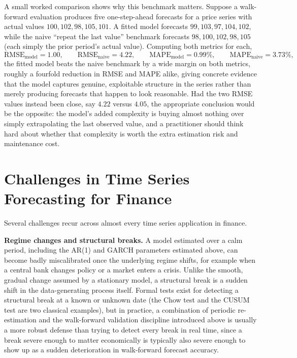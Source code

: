 \documentclass[../ai_in_finance]{subfiles}
\begin{document}
A small worked comparison shows why this benchmark matters. Suppose a walk-forward evaluation produces five one-step-ahead forecasts for a price series with actual values $100, 102, 98, 105, 101$. A fitted model forecasts $99, 103, 97, 104, 102$, while the naive ``repeat the last value'' benchmark forecasts $98, 100, 102, 98, 105$ (each simply the prior period's actual value). Computing both metrics for each,
\begin{equation*}
\text{RMSE}_{\text{model}} = 1.00, \qquad \text{RMSE}_{\text{naive}} = 4.22, \qquad \text{MAPE}_{\text{model}} = 0.99\%, \qquad \text{MAPE}_{\text{naive}} = 3.73\%,
\end{equation*}
the fitted model beats the naive benchmark by a wide margin on both metrics, roughly a fourfold reduction in RMSE and MAPE alike, giving concrete evidence that the model captures genuine, exploitable structure in the series rather than merely producing forecasts that happen to look reasonable. Had the two RMSE values instead been close, say $4.22$ versus $4.05$, the appropriate conclusion would be the opposite: the model's added complexity is buying almost nothing over simply extrapolating the last observed value, and a practitioner should think hard about whether that complexity is worth the extra estimation risk and maintenance cost.

\section{Challenges in Time Series Forecasting for Finance}

Several challenges recur across almost every time series application in finance.

\textbf{Regime changes and structural breaks.} A model estimated over a calm period, including the AR(1) and GARCH parameters estimated above, can become badly miscalibrated once the underlying regime shifts, for example when a central bank changes policy or a market enters a crisis. Unlike the smooth, gradual change assumed by a stationary model, a structural break is a sudden shift in the data-generating process itself.
Formal tests exist for detecting a structural break at a known or unknown date (the Chow test and the CUSUM test are two classical examples), but in practice, a combination of periodic re-estimation and the walk-forward validation discipline introduced above is usually a more robust defense than trying to detect every break in real time, since a break severe enough to matter economically is typically also severe enough to show up as a sudden deterioration in walk-forward forecast accuracy.
\end{document}
